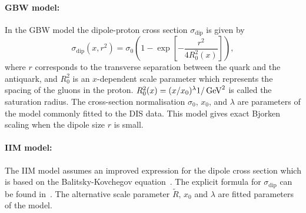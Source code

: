 \paragraph{GBW model:} \rm
In the GBW model the dipole-proton cross section $\sigma_{\text{dip}}$ is given by
\begin{equation}
\label{eGBW}
   \sigma_{\text{dip}}(x,r^{2}) = \sigma_{0} \left(1 - \exp \left[-\frac{r^{2}}{4R_{0}^{2}(x)} \right]\right),
\end{equation}
where $r$ corresponds to the transverse separation between the quark and the antiquark, and $R_{0}^{2}$
 is 
an $x$-dependent scale parameter which represents the spacing of the gluons in the proton. 
$R_0^2(x) = (x/x_0)^\lambda  1/ {\rm \,\text{Ge\hspace{-.08em}V}}^{2}$ is called the saturation radius.
The cross-section normalisation $\sigma_0$, $x_0$, and $\lambda$ are parameters 
of the model commonly fitted to the DIS data.
This model gives exact Bjorken scaling when the dipole size $r$ is small.

\paragraph{IIM model:} \rm
The IIM model assumes an improved expression for the dipole cross section which is based on the 
Balitsky-Kovchegov equation~\cite{Balitsky:1995ub}. The explicit formula for $\sigma_{\text{dip}}$ 
can be found in~\cite{Iancu:2003ge}. 
The alternative scale parameter $\tilde{R}$, $x_{0}$ and $\lambda$ are fitted parameters of the model.

